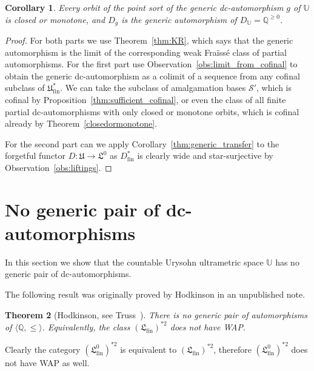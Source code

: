 \documentclass[10pt,a4paper]{article}
\newtheorem{tw}{Theorem}[section]
\newtheorem{wn}[tw]{Corollary}
\theoremstyle{definition}
\theoremstyle{remark}
\newcommand \seq [1]{\langle #1 \rangle}
\newcommand \maps {\colon} %
\newcommand \Q {\mathbb{Q}}
\newcommand \Qpos {\Q^{\geq 0}}
\newcommand \U {\mathbb{U}}
\newcommand \Su {\mathscr{S}}
\newcommand \fin {{\operatorname{fin}}}
\newcommand \Lin {\mathfrak{L}}
\newcommand \Ult {\mathfrak{U}}
\begin{document}
\begin{wn}\label{wn:generic-clo or mon}
    Every orbit of the point sort of the generic dc-automorphism $g$ of $\U$ is closed or monotone, and $D_g$ is the generic automorphism of $D_\U = \Qpos$.
\end{wn}
\begin{proof}
    For both parts we use Theorem~\ref{thm:KR}, which says that the generic automorphism is the limit of the corresponding weak Fraïssé class of partial automorphisms.
    For the first part use Observation~\ref{obs:limit_from_cofinal} to obtain the generic dc-automorphism as a colimit of a sequence from any cofinal subclass of $\Ult_\fin^*$.
    We can take the subclass of amalgamation bases $\Su'$, which is cofinal by Proposition~\ref{thm:sufficient_cofinal}, or even the class of all finite partial dc-automorphisms with only closed or monotone orbits, which is cofinal already by Theorem~\ref{closedormonotone}.

   
    For the second part can we apply Corollary~\ref{thm:generic_transfer} to the forgetful functor $D\maps \Ult \to \Lin^0$ as $D^*_\fin$ is clearly wide and star-surjective by Observation~\ref{obs:liftings}.
\end{proof}




\section{No generic pair of dc-automorphisms}
\label{sec:no_pair}

In this section we show that the countable Urysohn ultrametric space $\U$ has no generic pair of dc-automorphisms.

The following result was originally proved by Hodkinson in an unpublished note.

\begin{tw}[{Hodkinson, see Truss~\cite[Theorem~2.4]{T}}]\label{Truss}
    There is no generic pair of automorphisms of $\seq{\Q, \leq}$.
    Equivalently, the class $(\Lin_\fin)^{*2}$ does not have WAP.
\end{tw}

Clearly the category $(\Lin_\fin^0)^{*2}$ is equivalent to $(\Lin_\fin)^{*2}$, therefore $(\Lin_\fin^0)^{*2}$ does not have WAP as well.
\end{document}
